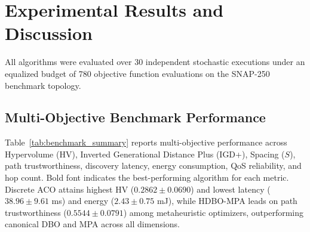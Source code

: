 \documentclass[journal,compsoc]{IEEEtran}
\begin{document}
\section{Experimental Results and Discussion}
All algorithms were evaluated over 30 independent stochastic executions under an equalized budget of 780 objective function evaluations on the SNAP-250 benchmark topology.

\subsection{Multi-Objective Benchmark Performance}
Table~\ref{tab:benchmark_summary} reports multi-objective performance across Hypervolume (HV), Inverted Generational Distance Plus (IGD+), Spacing ($S$), path trustworthiness, discovery latency, energy consumption, QoS reliability, and hop count. Bold font indicates the best-performing algorithm for each metric. Discrete ACO attains highest HV ($0.2862 \pm 0.0690$) and lowest latency ($38.96 \pm 9.61$ ms) and energy ($2.43 \pm 0.75$ mJ), while HDBO-MPA leads on path trustworthiness ($0.5544 \pm 0.0791$) among metaheuristic optimizers, outperforming canonical DBO and MPA across all dimensions.
\end{document}
